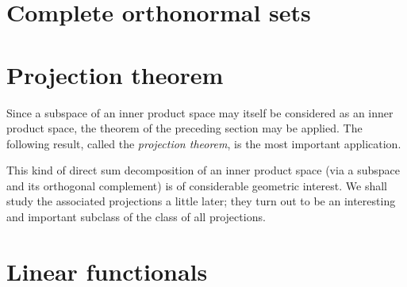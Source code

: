 \section{Complete orthonormal sets}

\section{Projection theorem}

Since a subspace of an inner product space may itself be considered as an inner
product space, the theorem of the preceding section may be applied. The
following result, called the \emph{projection theorem}, is the most important
application.

This kind of direct sum decomposition of an inner product space (via a subspace
and its orthogonal complement) is of considerable geometric interest. We shall
study the associated projections a little later; they turn out to be an
interesting and important subclass of the class of all projections.


\section{Linear functionals}


